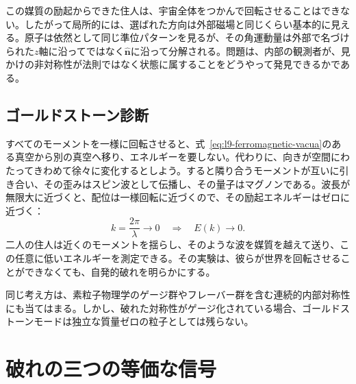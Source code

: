 この媒質の励起からできた住人は、宇宙全体をつかんで回転させることはできない。したがって局所的には、選ばれた方向は外部磁場と同じくらい基本的に見える。原子は依然として同じ準位パターンを見るが、その角運動量は外部で名づけられた\(z\)軸に沿ってではなく\(\hat{\mathbf n}\)に沿って分解される。問題は、内部の観測者が、見かけの非対称性が法則ではなく状態に属することをどうやって発見できるかである。

\subsection{ゴールドストーン診断}

すべてのモーメントを一様に回転させると、式~\eqref{eq:l9-ferromagnetic-vacua}のある真空から別の真空へ移り、エネルギーを要しない。代わりに、向きが空間にわたってきわめて徐々に変化するとしよう。すると隣り合うモーメントが互いに引き合い、その歪みはスピン波として伝播し、その量子はマグノンである。波長が無限大に近づくと、配位は一様回転に近づくので、その励起エネルギーはゼロに近づく：
\begin{equation}
k=\frac{2\pi}{\lambda}\longrightarrow0
\quad\Longrightarrow\quad
E(k)\longrightarrow0.
\label{eq:l9-gapless-magnon}
\end{equation}
二人の住人は近くのモーメントを揺らし、そのような波を媒質を越えて送り、この任意に低いエネルギーを測定できる。その実験は、彼らが世界を回転させることができなくても、自発的破れを明らかにする。


同じ考え方は、素粒子物理学のゲージ群やフレーバー群を含む連続的内部対称性にも当てはまる。しかし、破れた対称性がゲージ化されている場合、ゴールドストーンモードは独立な質量ゼロの粒子としては残らない。

\begin{classroomqa}
\end{classroomqa}

\section{破れの三つの等価な信号}

